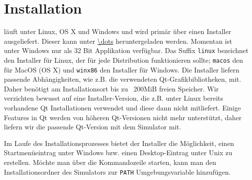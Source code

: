 
\pagebreak
\section{Installation}

\erasim{} läuft unter Linux, OS X und Windows und wird primär über einen
Installer ausgeliefert. Dieser kann unter \url{\dots} heruntergeladen werden.
Momentan ist \erasim{} unter Windows nur als 32 Bit Applikation verfügbar. Das
Suffix \texttt{linux} bezeichnet den Installer für Linux, der für jede
Distribution funktionieren sollte; \texttt{macos} den für MacOS (OS X) und
\texttt{winx86} den Installer für Windows. Die Installer liefern passende
Abhängigkeiten, wie z.B. die verwendeten Qt-Grafikbibliotheken, mit. Daher
benötigt \erasim{} am Installationsort bis zu ~200MiB freien Speicher. Wir
verzichten bewusst auf eine Installer-Version, die z.B. unter Linux bereits
vorhandene Qt Installationen verwendet und diese dann nicht mitliefert. Einige
Features in Qt werden von höheren Qt-Versionen nicht mehr unterstützt, daher
liefern wir die passende Qt-Version mit dem Simulator mit.

Im Laufe des Installationsprozesses bietet der Installer die Möglichkeit, einen
Startmenüeintrag unter Windows bzw. einen Desktop-Eintrag unter Unix zu
erstellen. Möchte man \erasim{} über die Kommandozeile starten, kann man den
Installationsordner des Simulators zur \texttt{PATH} Umgebungsvariable
hinzufügen.
